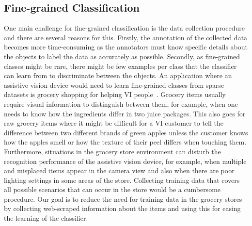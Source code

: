 
\subsection{Fine-grained Classification}


One main challenge for fine-grained classification is the data collection procedure and there are several reasons for this. Firstly, the annotation of the collected data becomes more time-consuming as the annotators must know specific details about the objects to label the data as accurately as possible. Secondly, as fine-grained classes might be rare, there might be few examples per class that the classifier can learn from to discriminate between the objects. An application where an assistive vision device would need to learn fine-grained classes from sparse datasets is grocery shopping for helping VI people~\cite{jafri2014computer, lanigan2006trinetra}. Grocery items usually require visual information to distinguish between them, for example, when one needs to know how the ingredients differ in two juice packages. This also goes for raw grocery items where it might be difficult for a VI customer to tell the difference between two different brands of green apples unless the customer knows how the apples smell or how the texture of their peel differs when touching them. Furthermore, situations in the grocery store environment can disturb the recognition performance of the assistive vision device, for example, when multiple and misplaced items appear in the camera view and also when there are poor lighting settings in some areas of the store. Collecting training data that covers all possible scenarios that can occur in the store would be a cumbersome procedure. Our goal is to reduce the need for training data in the grocery stores by collecting web-scraped information about the items and using this for easing the learning of the classifier. 

